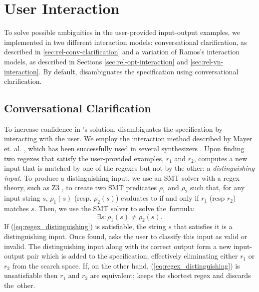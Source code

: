 \section{User Interaction} \label{sec:regex-interaction}

To solve possible ambiguities in the user-provided input-output examples, we implemented in \Forest{} two different interaction models: conversational clarification, as described in \autoref{sec:rel-conv-clarification} and a variation of Ramos's interaction models, as described in Sections \ref{sec:rel-opt-interaction} and \ref{sec:rel-yn-interaction}. By default, \Forest{} disambiguates the specification using conversational clarification.

\subsection{Conversational Clarification}\label{sec:interaction-cc}

To increase confidence in \Forest{}'s solution, \Forest{} disambiguates the specification by interacting with the user. %
We employ the interaction method described by Mayer et. al. \cite{DBLP:conf/uist/MayerSGLMPSZG15}, which has been successfully used in several synthesizers  \cite{DBLP:journals/pvldb/LiCM15,DBLP:conf/sigmod/WangCB17,DBLP:conf/pldi/WangCB17}.
Upon finding two regexes that satisfy the user-provided examples, \(r_1\) and \(r_2\), \Forest{} computes a new input that is matched by one of the regexes but not by the other: a \textit{distinguishing input}.     
To produce a distinguishing input, we use an \ac{SMT} solver with a regex theory, such as Z3 \cite{z3,z3str317}, to create two \ac{SMT} predicates \(\rho_{1}\) and \(\rho_{2}\) such that, for any input string \(s\), \(\rho_{1}(s)\) (resp. \(\rho_{2}(s)\)) evaluates to \true{} if and only if \(r_1\) (resp \(r_2\)) matches \(s\).
Then, we use the \ac{SMT} solver to solve the~formula:
%
\begin{equation}\label{eq:regex_distinguishing}
  \exists s: \rho_{1}(s) \neq \rho_{2}(s).
\end{equation}
%
If (\ref{eq:regex_distinguishing}) is satisfiable, the string \(s\) that satisfies it is a distinguishing input. Once found, \Forest{} asks the user to classify this input as valid or invalid.
The distinguishing input along with its correct output form a new input-output pair which is added to the specification, effectively eliminating either \(r_1\) or \(r_2\) from the search space.
If, on the other hand, (\ref{eq:regex_distinguishing}) is unsatisfiable then \(r_1\) and \(r_2\) are equivalent; \Forest{} keeps the shortest regex and discards the~other.

